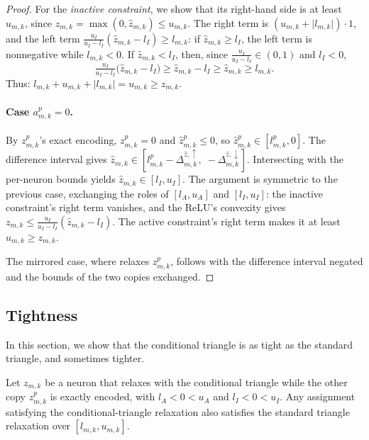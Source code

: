 {{\begin{proof}
For the \emph{inactive constraint}, we show that its right-hand side is at
least $u_{m,k}$, since $z_{m,k}=\max(0,\hat z_{m,k})\leq u_{m,k}$. The right term
is $(u_{m,k}+\lvert l_{m,k}\rvert)\cdot 1$, and the left term
$\tfrac{u_I}{u_I-l_I}(\hat z_{m,k}-l_I)\geq l_{m,k}$: if $\hat z_{m,k}\geq l_I$,
the left term is nonnegative while $l_{m,k}<0$. If $\hat z_{m,k}< l_I$, then, since
$\tfrac{u_I}{u_I-l_I}\in(0,1)$ and $l_I<0$,
\[
 \tfrac{u_I}{u_I-l_I}\bigl(\hat z_{m,k}-l_I\bigr)
 \geq \hat z_{m,k}-l_I\geq \hat z_{m,k}\geq l_{m,k}.
\]
Thus:
$l_{m,k}+u_{m,k}+\lvert l_{m,k}\rvert=u_{m,k}\geq z_{m,k}$.


\paragraph{Case $a^{p}_{m,k}=0$.}
By $z^{p}_{m,k}$'s exact encoding, $z^{p}_{m,k}=0$ and $\hat z^{p}_{m,k}\leq 0$, so
$\hat z^{p}_{m,k}\in[l^{p}_{m,k},0]$. The difference interval gives
$\hat z_{m,k}\in[l^{p}_{m,k}-\Delta^{\hat z,\uparrow}_{m,k},\;-\Delta^{\hat z,\downarrow}_{m,k}]$.
Intersecting with the per-neuron bounds yields $\hat z_{m,k}\in[l_I,u_I]$.
The argument is symmetric to the previous case, exchanging the roles of $[l_A,u_A]$ and
$[l_I,u_I]$: the inactive constraint's right term vanishes, and the ReLU's convexity
gives $z_{m,k}\leq \tfrac{u_I}{u_I-l_I}(\hat z_{m,k}-l_I)$. The active constraint's
right term makes it at least $u_{m,k}\geq z_{m,k}$. 

The mirrored case, where \tool relaxes $z^{p}_{m,k}$, follows with the difference
interval negated and the bounds of the two copies exchanged.
\end{proof}

\subsection{Tightness}
\label{sec:blend-condtri-tightness}

In this section, we show that the conditional triangle is as tight as the standard triangle, and sometimes tighter.

\begin{lemma}\label{lem:cond-tri-tighter}
Let $z_{m,k}$ be a neuron that \tool relaxes with the conditional triangle while the
other copy $z^{p}_{m,k}$ is exactly encoded, with $l_A < 0 < u_A$ and
$l_I < 0 < u_I$. Any assignment satisfying the conditional-triangle relaxation also
satisfies the standard triangle relaxation over $[l_{m,k},u_{m,k}]$.
\end{lemma}

}}
